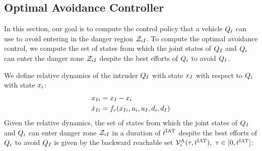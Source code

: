 \subsection{Optimal Avoidance Controller} \label{sec:intruder_avoid}
In this section, our goal is to compute the control policy that a vehicle $Q_i$ can use to avoid entering in the danger region $\mathcal{Z}_{iI}$. To compute the optimal avoidance control, we compute the set of states from which the joint states of $Q_{I}$ and $Q_i$ can enter the danger zone $\mathcal{Z}_{iI}$ despite the best efforts of $Q_i$ to avoid $Q_{I}$. 

We define relative dynamics of the intruder $Q_{I}$ with state $x_I$ with respect to $Q_i$ with state $x_i$:
\begin{equation}
\label{eq:reldyn}
\begin{aligned}
\state_{\intr i} &= \state_\intr - \state_i \\
\dot \state_{\intr i} &= f_r(\state_{\intr i}, \ctrl_i, \ctrl_\intr, \dstb_i, \dstb_\intr)
\end{aligned}
\end{equation}
Given the relative dynamics, the set of states from which the joint states of $Q_{I}$ and $Q_{i}$ can enter danger zone $\mathcal{Z}_{iI}$ in a duration of $t^\text{IAT}$ despite the best efforts of $Q_i$ to avoid $Q_{I}$ is given by the backward reachable set $\mathcal{V}^{\text{A}}_i(\tau, t^\text{IAT}),~ \tau \in [0, t^\text{IAT}]$:

